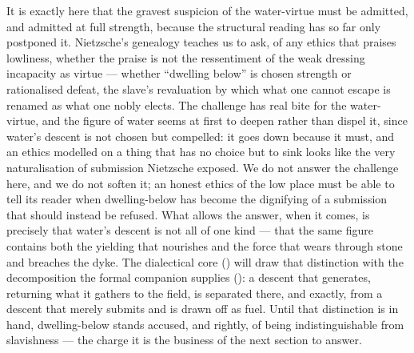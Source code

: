 It is exactly here that the gravest suspicion of the water-virtue must be admitted, and admitted at full strength, because the structural reading has so far only postponed it. Nietzsche's genealogy teaches us to ask, of any ethics that praises lowliness, whether the praise is not the ressentiment of the weak dressing incapacity as virtue --- whether ``dwelling below'' is chosen strength or rationalised defeat, the slave's revaluation by which what one cannot escape is renamed as what one nobly elects. The challenge has real bite for the water-virtue, and the figure of water seems at first to deepen rather than dispel it, since water's descent is not chosen but compelled: it goes down because it must, and an ethics modelled on a thing that has no choice but to sink looks like the very naturalisation of submission Nietzsche exposed. We do not answer the challenge here, and we do not soften it; an honest ethics of the low place must be able to tell its reader when dwelling-below has become the dignifying of a submission that should instead be refused. What allows the answer, when it comes, is precisely that water's descent is not all of one kind --- that the same figure contains both the yielding that nourishes and the force that wears through stone and breaches the dyke. The dialectical core () will draw that distinction with the decomposition the formal companion supplies (): a descent that generates, returning what it gathers to the field, is separated there, and exactly, from a descent that merely submits and is drawn off as fuel. Until that distinction is in hand, dwelling-below stands accused, and rightly, of being indistinguishable from slavishness --- the charge it is the business of the next section to answer.
